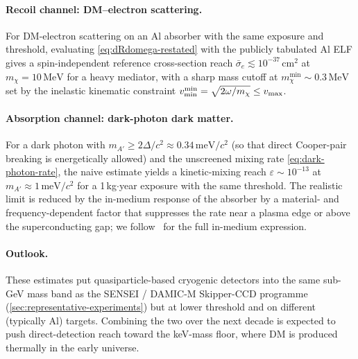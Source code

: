 \paragraph{Recoil channel: DM--electron scattering.}
For DM-electron scattering on an Al absorber with the same
exposure and threshold, evaluating \cref{eq:dRdomega-restated}
with the publicly tabulated Al ELF gives a spin-independent
reference cross-section reach
$\bar\sigma_e\lesssim 10^{-37}\,\text{cm}^2$ at
$m_\chi=10\,\text{MeV}$ for a heavy mediator, with a sharp
mass cutoff at $m_\chi^{\min}\sim 0.3\,\text{MeV}$ set by the
inelastic kinematic constraint
$v_{\rm min}^{\min}=\sqrt{2\omega/m_\chi}\leq v_{\rm max}$.

\paragraph{Absorption channel: dark-photon dark matter.}
For a dark photon with $m_{A'}\geq 2\Delta/c^2\approx 0.34\,\text{meV}/c^2$
(so that direct Cooper-pair breaking is energetically allowed)
and the unscreened mixing rate \cref{eq:dark-photon-rate}, the
naive estimate yields a kinetic-mixing reach
$\varepsilon\sim 10^{-13}$ at $m_{A'}\approx 1\,\text{meV}/c^2$
for a 1\,kg$\cdot$year exposure with the same threshold. The
realistic limit is reduced by the in-medium response of the
absorber by a material- and frequency-dependent factor that
suppresses the rate near a plasma edge or above the
superconducting gap; we follow~\cite{caputo2021review} for the
full in-medium expression.

\paragraph{Outlook.}
These estimates put quasiparticle-based cryogenic detectors into
the same sub-GeV mass band as the SENSEI / DAMIC-M Skipper-CCD
programme (\cref{sec:representative-experiments}) but at lower
threshold and on different (typically Al) targets. Combining the
two over the next decade is expected to push direct-detection
reach toward the keV-mass floor, where DM is produced thermally
in the early universe.
